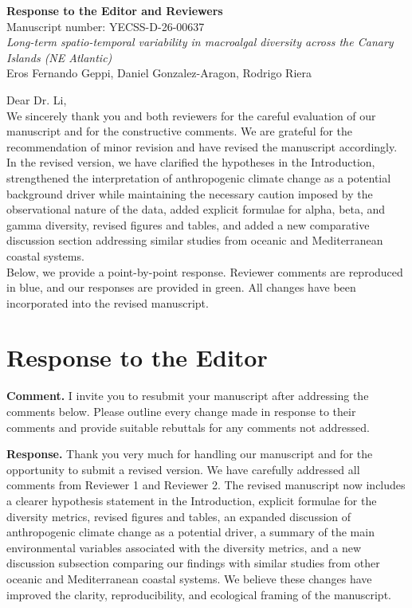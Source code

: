 \documentclass[12pt]{article}
\newcommand{\reviewercomment}[1]{%
\vspace{0.3em}
\noindent\textbf{Comment.} \textcolor{commentblue}{#1}\par
}
\newcommand{\authorresponse}[1]{%
\vspace{0.3em}
\noindent\textbf{Response.} \textcolor{responsegreen}{#1}\par
\vspace{0.8em}
}
\begin{document}
\begin{center}
{\Large \textbf{Response to the Editor and Reviewers}}\\[0.5cm]
{\large Manuscript number: YECSS-D-26-00637}\\[0.25cm]
{\large \textit{Long-term spatio-temporal variability in macroalgal diversity across the Canary Islands (NE Atlantic)}}\\[0.25cm]
{Eros Fernando Geppi, Daniel Gonzalez-Aragon, Rodrigo Riera}\\[0.5cm]
\end{center}

\noindent Dear Dr. Li,\\[0.3cm]

\noindent We sincerely thank you and both reviewers for the careful evaluation of our manuscript and for the constructive comments. We are grateful for the recommendation of minor revision and have revised the manuscript accordingly. \\ 

In the revised version, we have clarified the hypotheses in the Introduction, strengthened the interpretation of anthropogenic climate change as a potential background driver while maintaining the necessary caution imposed by the observational nature of the data, added explicit formulae for alpha, beta, and gamma diversity, revised figures and tables, and added a new comparative discussion section addressing similar studies from oceanic and Mediterranean coastal systems. \\ 

\noindent Below, we provide a point-by-point response. Reviewer comments are reproduced in blue, and our responses are provided in green. All changes have been incorporated into the revised manuscript.

\section{Response to the Editor}

\reviewercomment{I invite you to resubmit your manuscript after addressing the comments below. Please outline every change made in response to their comments and provide suitable rebuttals for any comments not addressed.}

\authorresponse{Thank you very much for handling our manuscript and for the opportunity to submit a revised version. We have carefully addressed all comments from Reviewer 1 and Reviewer 2. The revised manuscript now includes a clearer hypothesis statement in the Introduction, explicit formulae for the diversity metrics, revised figures and tables, an expanded discussion of anthropogenic climate change as a potential driver, a summary of the main environmental variables associated with the diversity metrics, and a new discussion subsection comparing our findings with similar studies from other oceanic and Mediterranean coastal systems. We believe these changes have improved the clarity, reproducibility, and ecological framing of the manuscript.}
\end{document}

